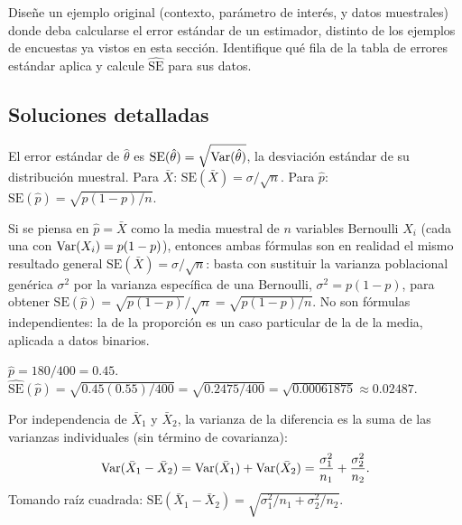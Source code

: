 \begin{problema}
	\label{prob:aaefa50}
	Diseñe un ejemplo original (contexto, parámetro de interés, y datos muestrales) donde deba calcularse el error estándar de un estimador, distinto de los ejemplos de encuestas ya vistos en esta sección. Identifique qué fila de la tabla de errores estándar aplica y calcule $\widehat{\text{SE}}$ para sus datos.
\end{problema}

\subsection*{Soluciones detalladas}

\begin{solproblema}[prob:395183d]
	El error estándar de $\hat\theta$ es $\text{SE}(\hat\theta) = \sqrt{\operatorname{Var}(\hat\theta)}$, la desviación estándar de su distribución muestral. Para $\bar X$: $\text{SE}(\bar X)=\sigma/\sqrt n$. Para $\hat p$: $\text{SE}(\hat p)=\sqrt{p(1-p)/n}$.
\end{solproblema}

\begin{solproblema}[prob:8a98763]
	Si se piensa en $\hat p = \bar X$ como la media muestral de $n$ variables Bernoulli $X_i$ (cada una con $\operatorname{Var}(X_i)=p(1-p)$), entonces ambas fórmulas son en realidad el mismo resultado general $\text{SE}(\bar X)=\sigma/\sqrt n$: basta con sustituir la varianza poblacional genérica $\sigma^2$ por la varianza específica de una Bernoulli, $\sigma^2=p(1-p)$, para obtener $\text{SE}(\hat p) = \sqrt{p(1-p)}/\sqrt n = \sqrt{p(1-p)/n}$. No son fórmulas independientes: la de la proporción es un caso particular de la de la media, aplicada a datos binarios.
\end{solproblema}

\begin{solproblema}[prob:0d972a2]
	$\hat p = 180/400 = 0.45$. $\widehat{\text{SE}}(\hat p) = \sqrt{0.45(0.55)/400} = \sqrt{0.2475/400} = \sqrt{0.00061875} \approx 0.02487$.
\end{solproblema}

\begin{solproblema}[prob:a48a78a]
	Por independencia de $\bar X_1$ y $\bar X_2$, la varianza de la diferencia es la suma de las varianzas individuales (sin término de covarianza):
	\begin{align*}
		\operatorname{Var}(\bar X_1-\bar X_2) = \operatorname{Var}(\bar X_1) + \operatorname{Var}(\bar X_2) = \frac{\sigma_1^2}{n_1} + \frac{\sigma_2^2}{n_2}.
	\end{align*}
	Tomando raíz cuadrada: $\text{SE}(\bar X_1-\bar X_2) = \sqrt{\sigma_1^2/n_1+\sigma_2^2/n_2}$.
\end{solproblema}

